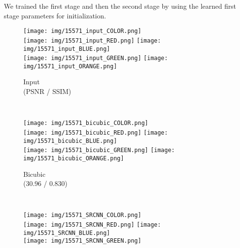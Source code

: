\documentclass[10pt,twocolumn,letterpaper]{article}
\begin{document}
 
We trained the first stage and then the second stage by using the learned first stage parameters for initialization.  
\begin{figure*}[t]
\begin{center}
    \begin{subfigure}[b]{\SizeFigCompareHRLarge\textwidth}
        \texttt{[image: img/15571\_input\_COLOR.png]}
        \\
        \texttt{[image: img/15571\_input\_RED.png]}
        \texttt{[image: img/15571\_input\_BLUE.png]}
        \\
        \texttt{[image: img/15571\_input\_GREEN.png]}
        \texttt{[image: img/15571\_input\_ORANGE.png]}
        \caption{Input \\ (PSNR / SSIM)}
        \label{fig:input}
    \end{subfigure}
    ~
    \begin{subfigure}[b]{\SizeFigCompareHRLarge\textwidth}
        \texttt{[image: img/15571\_bicubic\_COLOR.png]}
        \\
        \texttt{[image: img/15571\_bicubic\_RED.png]}
        \texttt{[image: img/15571\_bicubic\_BLUE.png]}
        \\
        \texttt{[image: img/15571\_bicubic\_GREEN.png]}
        \texttt{[image: img/15571\_bicubic\_ORANGE.png]}
        \caption{Bicubic \\ (30.96 / 0.830)}
        \label{fig:bicubic}
    \end{subfigure}
    ~
    \begin{subfigure}[b]{\SizeFigCompareHRLarge\textwidth}
        \texttt{[image: img/15571\_SRCNN\_COLOR.png]}
        \\
        \texttt{[image: img/15571\_SRCNN\_RED.png]}
        \texttt{[image: img/15571\_SRCNN\_BLUE.png]}
        \\
        \texttt{[image: img/15571\_SRCNN\_GREEN.png]}

\end{subfigure}
\end{center}
\end{figure*}
\end{document}
